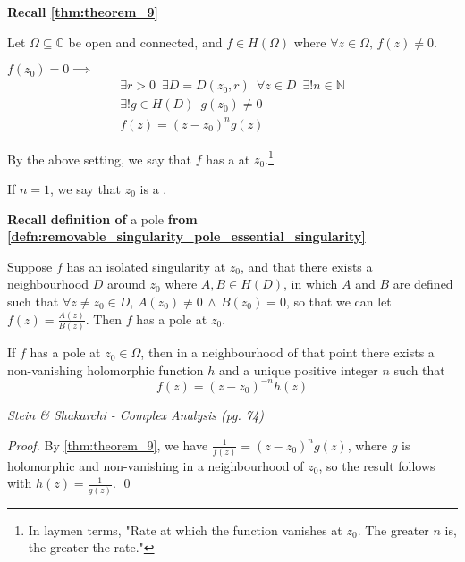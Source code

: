 \documentclass[11pt, oneside]{book}
\begin{document}
\textbf{Recall \cref{thm:theorem_9}}

Let $\Omega \subseteq \mathbb{C}$ be open and connected, and $f \in H(\Omega)$ where $\forall z \in \Omega, \, f(z) \neq 0$.

$f(z_0) = 0 \implies$
\begin{gather*}
	\exists r > 0 \enspace \exists D = D(z_0, r) \enspace \forall z \in D \enspace \exists! n \in \mathbb{N} \\
	\exists! g \in H(D) \enspace g(z_0) \neq 0 \\
	f(z) = (z - z_0)^n g(z)
\end{gather*}

\begin{defn}\label{defn:zero_of_order_n_&_simple_zero}
	By the above setting, we say that $f$ has a  at $z_0$.\footnote{In laymen terms, "Rate at which the function vanishes at $z_0$. The greater $n$ is, the greater the rate."}

	If $n = 1$, we say that $z_0$ is a .
\end{defn}

\textbf{Recall definition of} a pole \textbf{from \cref{defn:removable_singularity_pole_essential_singularity}}

Suppose $f$ has an isolated singularity at $z_0$, and that there exists a neighbourhood $D$ around $z_0$ where $A, B \in H(D)$, in which $A$ and $B$ are defined such that $\forall z \neq z_0 \in D$, $A(z_0) \neq 0 \, \land \, B(z_0) = 0$, so that we can let $f(z) = \frac{A(z)}{B(z)}$. Then $f$ has a pole at $z_0$.

\begin{thm}[Theorem 9.1]\label{thm:theorem_9.1}
	If $f$ has a pole at $z_0 \in \Omega$, then in a neighbourhood of that point there exists a non-vanishing holomorphic function $h$ and a unique positive integer $n$ such that
	\begin{equation*}
		f(z) = (z - z_0)^{-n} h(z)
	\end{equation*}
\end{thm}

\textit{Stein \& Shakarchi - Complex Analysis (pg. 74)}

\begin{proof}
	By \cref{thm:theorem_9}, we have $\frac{1}{f(z)} = (z - z_0)^n g(z)$, where $g$ is holomorphic and non-vanishing in a neighbourhood of $z_0$, so the result follows with $h(z) = \frac{1}{g(z)}$. \qed
\end{proof}
\end{document}
